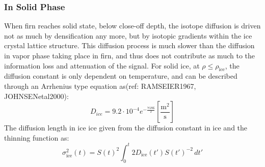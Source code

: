 \documentclass[../../CompleteThesis/Complete_1stDraft.tex]{subfiles}
\begin{document}
\subsubsection{In Solid Phase}
When firn reaches solid state, below close-off depth, the isotope diffusion is driven not as much by densification any more, but by isotopic gradients within the ice crystal lattice structure. This diffusion process is much slower than the diffusion in vapor phase taking place in firn, and thus does not contribute as much to the information loss and attenuation of the signal. For solid ice, at $\rho \leq \rho_{\text{ice}}$, the diffusion constant is only dependent on temperature, and can be described through an Arrhenius type equation as(ref: RAMSEIER1967, JOHNSENetal2000):
\begin{equation}
	D_{ice} = 9.2 \cdot 10^{-4} e^{-\frac{7186}{T}} 	\left[\frac{\text{m}^2}{\text{s}}\right]
	\label{eq:Ice_Diff_const}
\end{equation}
The diffusion length in ice ice given from the diffusion constant in ice and the thinning function as:
\begin{equation}
	\sigma^2_{\text{ice}}(t) = S(t)^2 \int_{0}^{t}2 D_{\text{ice}}(t') S(t')^{-2} \, dt'
	\label{eq:Diff_Len_Ice}
\end{equation}
\end{document}
